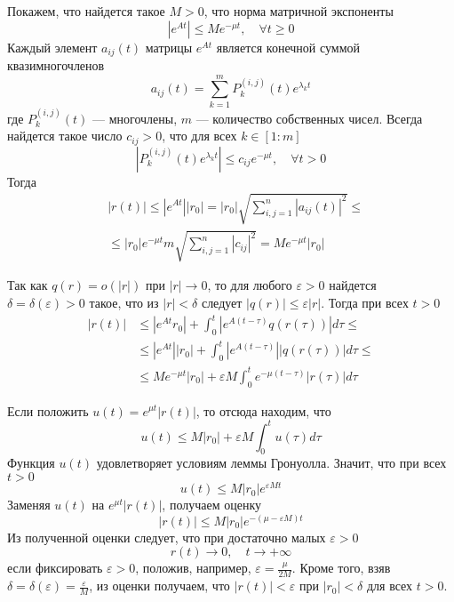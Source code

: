 Покажем, что найдется такое $M > 0$, что норма матричной экспоненты
\begin{equation*}
    |e^{At}| \le Me^{-\mu t}, \quad \forall t \ge 0
\end{equation*}
Каждый элемент $a_{ij}(t)$ матрицы $e^{At}$ является конечной суммой квазимногочленов
\begin{equation*}
    a_{ij}(t) = \sum_{k=1}^m P_k^{(i,j)}(t) e^{\lambda_kt}
\end{equation*}
где $P_k^{(i,j)}(t)$ --- многочлены, $m$ --- количество собственных чисел. Всегда найдется такое число $c_{ij} > 0$, что для всех $k \in [1:m]$
\begin{equation*}
    |P_k^{(i,j)}(t)e^{\lambda_kt}| \le c_{ij}e^{-\mu t}, \quad \forall t > 0
\end{equation*}
Тогда
\begin{equation*}
    \begin{aligned}
        &|r(t)| \le |e^{At}| |r_0| = |r_0| \sqrt{\sum_{i,j=1}^n |a_{ij}(t)|^2} \le\\
        &\le |r_0| e^{-\mu t}m \sqrt{\sum_{i,j=1}^n |c_{ij}|^2} = Me^{-\mu t} |r_0|
    \end{aligned}
\end{equation*}

Так как $q(r) = o(|r|)$ при $|r| \to 0$, то для любого $\varepsilon > 0$ найдется $\delta = \delta(\varepsilon) > 0$ такое, что из $|r| < \delta$ следует $|q(r)| \le \varepsilon|r|$. Тогда при всех $t > 0$
\begin{equation*}
    \begin{aligned}
        |r(t)| &\le |e^{At} r_0| + \int_0^t |e^{A(t - \tau)} q(r(\tau))|d\tau \le\\
        &\le |e^{At}| |r_0| + \int_0^t |e^{A(t - \tau)}| |q(r(\tau))|d\tau \le\\
        &\le Me^{-\mu t} |r_0| + \varepsilon M\int_0^t e^{-\mu (t - \tau)}|r(\tau)|d\tau
    \end{aligned}
\end{equation*}

Если положить $u(t) = e^{\mu t}|r(t)|$, то отсюда находим, что
\begin{equation*}
    u(t) \le M |r_0| + \varepsilon M\int_0^t u(\tau)d\tau
\end{equation*}
Функция $u(t)$ удовлетворяет условиям леммы Гронуолла. Значит, что при всех $t > 0$
\begin{equation*}
    u(t) \le M |r_0|e^{\varepsilon Mt}
\end{equation*}
Заменяя $u(t)$ на $e^{\mu t} |r(t)|$, получаем оценку
\begin{equation*}
    |r(t)| \le M |r_0|e^{-(\mu - \varepsilon M)t}
\end{equation*}
Из полученной оценки следует, что при достаточно малых $\varepsilon > 0$
\begin{equation*}
    r(t) \to 0, \quad t \to +\infty
\end{equation*}
если фиксировать $\varepsilon > 0$, положив, например, $\varepsilon = \frac{\mu}{2M}$. Кроме того, взяв $\delta = \delta(\varepsilon) = \frac{\varepsilon}{M}$, из оценки получаем, что $|r(t)| < \varepsilon$ при $|r_0| < \delta$ для всех $t > 0$.


